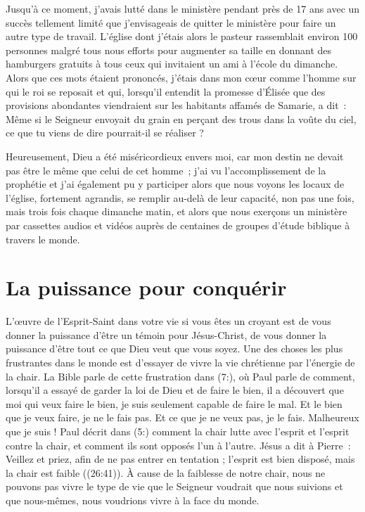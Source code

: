 Jusqu'à ce moment, j'avais lutté dans le ministère pendant près de 17 ans
 avec un succès tellement limité que j'envisageais de quitter le ministère
 pour faire un autre type de travail.
 L'église dont j'étais alors le pasteur rassemblait environ 100 personnes
 malgré tous nous efforts pour augmenter sa taille en donnant des hamburgers
 gratuits à tous ceux qui invitaient un ami à l'école du dimanche.
 Alors que ces mots étaient prononcés, j'étais dans mon cœur comme l'homme
 sur qui le roi se reposait et qui, lorsqu'il entendit la promesse d'Élisée
 que des provisions abondantes viendraient sur les habitants affamés
 de Samarie, a dit~:
 \og Même si le Seigneur envoyait du grain en perçant des trous dans
 la voûte du ciel, ce que tu viens de dire pourrait-il se réaliser ? \fg{}

Heureusement, Dieu a été miséricordieux envers moi,
 car mon destin ne devait pas être le même que celui de cet homme~;
 j'ai vu l'accomplissement de la prophétie et j'ai également pu y participer
 alors que nous voyons les locaux de l'église, fortement agrandis,
 se remplir au-delà de leur capacité, non pas une fois, mais trois fois
 chaque dimanche matin, et alors que nous exerçons un ministère
 par cassettes audios et vidéos auprès de centaines de groupes
 d'étude biblique à travers le monde.

\section*{La puissance pour conquérir}

L'œuvre de l'Esprit-Saint dans votre vie si vous êtes un croyant
 est de vous donner la puissance d'être un témoin pour Jésus-Christ,
 de vous donner la puissance d'être tout ce que Dieu veut que vous soyez.
 Une des choses les plus frustrantes dans le monde est d'essayer
 de vivre la vie chrétienne par l'énergie de la chair.
 La Bible parle de cette frustration dans (7:),
 où Paul parle de comment, lorsqu'il a essayé de garder la loi de Dieu
 et de faire le bien, il a découvert que \og moi qui veux faire le bien,
 je suis seulement capable de faire le mal. Et le bien que je veux faire,
 je ne le fais pas. Et ce que je ne veux pas, je le fais.
 Malheureux que je suis ! \fg{}
 Paul décrit dans (5:) comment la chair lutte avec l'esprit
 et l'esprit contre la chair, et comment ils sont opposés l'un à l'autre.
 Jésus a dit à Pierre~:
 \og Veillez et priez, afin de ne pas entrer en tentation ;
 l'esprit est bien disposé, mais la chair est faible \fg{}
 ((26:41)).
 À cause de la faiblesse de notre chair, nous ne pouvons pas vivre
 le type de vie que le Seigneur voudrait que nous suivions
 et que nous-mêmes, nous voudrions vivre à la face du monde.

